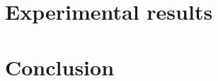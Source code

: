 \documentclass[12pt]{report}
\begin{document}
\chapter{Experimental results} 






\chapter{Conclusion}














\end{document}
